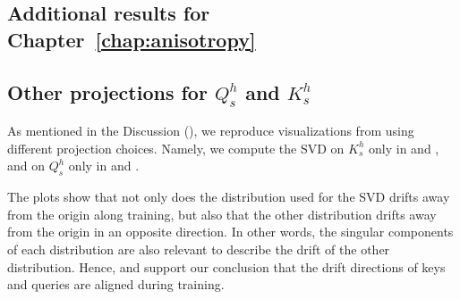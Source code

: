 
\renewcommand{\thesection}{\Alph{section}}

\begin{appendices}
\section{Additional results for Chapter~\ref{chap:anisotropy}}
\subsection{Other projections for \texorpdfstring{$Q^h_s$}{queries} and \texorpdfstring{$K^h_s$}{keys}}
\label{sec:other_projs}

As mentioned in the Discussion (), we reproduce visualizations from  using different projection choices. Namely, we compute the SVD on $K^h_s$ only in  and , and on $Q^h_s$ only in  and .

The plots show that not only does the distribution used for the SVD drifts away from the origin along training, but also that the other distribution drifts away from the origin in an opposite direction. In other words, the singular components of each distribution are also relevant to describe the drift of the other distribution. Hence,  and  support our conclusion that the drift directions of keys and queries are aligned during training.



\end{appendices}
